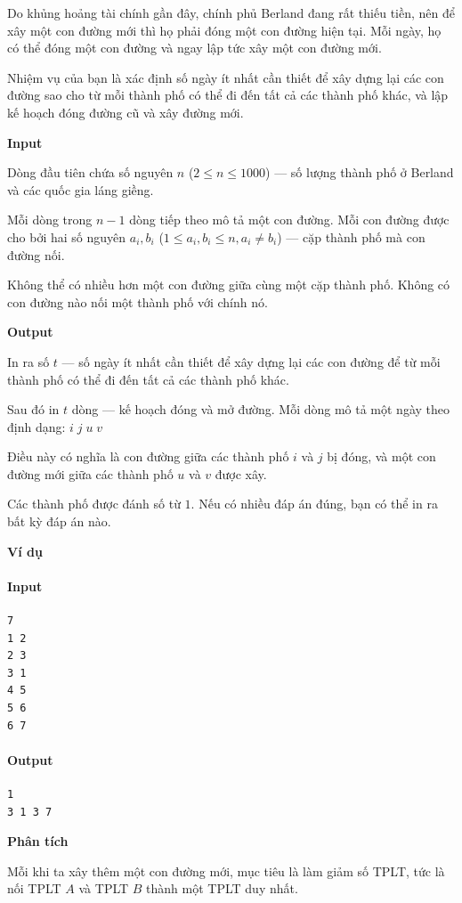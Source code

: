 \documentclass{article}
\begin{document}
Do khủng hoảng tài chính gần đây, chính phủ Berland đang rất thiếu tiền, 
nên để xây một con đường mới thì họ phải đóng một con đường hiện tại. 
Mỗi ngày, họ có thể đóng một con đường và ngay lập tức xây một con đường mới. 

Nhiệm vụ của bạn là xác định số ngày ít nhất cần thiết để xây dựng lại các con đường sao cho từ mỗi thành phố có thể đi đến tất cả các thành phố khác, 
và lập kế hoạch đóng đường cũ và xây đường mới.

\textbf{Input}

Dòng đầu tiên chứa số nguyên $n$ ($2 \le n \le 1000$) — số lượng thành phố ở Berland và các quốc gia láng giềng.  

Mỗi dòng trong $n - 1$ dòng tiếp theo mô tả một con đường.  
Mỗi con đường được cho bởi hai số nguyên $a_i, b_i$ ($1 \le a_i, b_i \le n, a_i \ne b_i$) — cặp thành phố mà con đường nối.  

Không thể có nhiều hơn một con đường giữa cùng một cặp thành phố.  
Không có con đường nào nối một thành phố với chính nó.

\textbf{Output}

In ra số $t$ — số ngày ít nhất cần thiết để xây dựng lại các con đường để từ mỗi thành phố có thể đi đến tất cả các thành phố khác.  

Sau đó in $t$ dòng — kế hoạch đóng và mở đường.  
Mỗi dòng mô tả một ngày theo định dạng: 
$
i \; j \; u \; v
$

Điều này có nghĩa là con đường giữa các thành phố $i$ và $j$ bị đóng, và một con đường mới giữa các thành phố $u$ và $v$ được xây.  

Các thành phố được đánh số từ $1$.  
Nếu có nhiều đáp án đúng, bạn có thể in ra bất kỳ đáp án nào.

\textbf{Ví dụ}
\paragraph{Input}
\begin{lstlisting}
7
1 2
2 3
3 1
4 5
5 6
6 7
\end{lstlisting}

\paragraph{Output}
\begin{lstlisting}
1
3 1 3 7
\end{lstlisting}

\textbf{Phân tích}

Mỗi khi ta xây thêm một con đường mới, mục tiêu là làm giảm số TPLT, tức là nối TPLT $A$ và TPLT $B$ thành một TPLT duy nhất. \\
\end{document}
